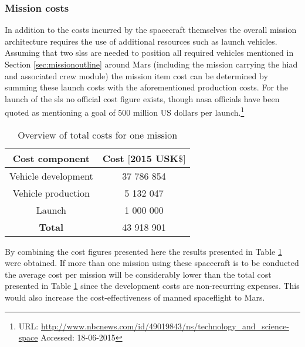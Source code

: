\subsubsection{Mission costs}
In addition to the costs incurred by the spacecraft themselves the overall mission architecture requires the use of additional resources such as launch vehicles. Assuming that two \glspl{sls} are needed to position all required vehicles mentioned in Section \ref{sec:missionoutline} around Mars (including the mission carrying the \gls{hiad} and associated crew module) the mission item cost can be determined by summing these launch costs with the aforementioned production costs. For the launch of the \gls{sls} no official cost figure exists, though \gls{nasa} officials have been quoted as mentioning a goal of $500$ million US dollars per launch.\footnote{URL: \url{http://www.nbcnews.com/id/49019843/ns/technology_and_science-space} Accessed: 18-06-2015}\\
\begin{table}[h]
	\centering
	\caption{Overview of total costs for one mission}
	\begin{tabular}{|c|c|}
		\hline
		\textbf{Cost component} & \textbf{Cost $\mathbf{[2015}$ $\mathbf{US K\$]}$} \\ \hline 
		\hline
		Vehicle development & 37 786 854 \\
		Vehicle production & 5 132 047\\
		Launch & 1 000 000\\ \hline
		\textbf{Total} & 43 918 901\\ \hline
	\end{tabular}
	\label{tab:missioncosts}
\end{table}
By combining the cost figures presented here the results presented in Table \ref{tab:missioncosts} were obtained. If more than one mission using these spacecraft is to be conducted the average cost per mission will be considerably lower than the total cost presented in Table \ref{tab:missioncosts} since the development costs are non-recurring expenses. This would also increase the cost-effectiveness of manned spaceflight to Mars.